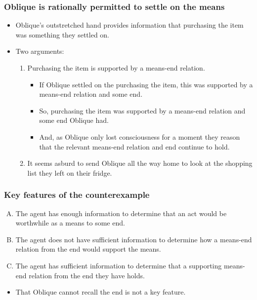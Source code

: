 \documentclass[noamssymb, compress, handout]{beamer} %
\newcommand{\hozlinedash}[0]{%
  \noindent\hdashrule[0.5ex][c]{\textwidth}{.1pt}{2.5pt}
}
\begin{document}
\begin{frame}
  \frametitle{Oblique is rationally permitted to settle on the means}

  \begin{itemize}
  \item Oblique's outstretched hand provides information that purchasing the item was something they settled on.
  \item Two arguments:
    \begin{enumerate}
    \item Purchasing the item is supported by a means-end relation.
      \begin{itemize}
      \item If Oblique settled on the purchasing the item, this was supported by a means-end relation and some end.
      \item So, purchasing the item was supported by a means-end relation and some end Oblique had.
      \item And, as Oblique only lost consciousness for a moment they reason that the relevant means-end relation and end continue to hold.
      \end{itemize}
    \item It seems asburd to send Oblique all the way home to look at the shopping list they left on their fridge.
    \end{enumerate}
  \end{itemize}

\end{frame}

\begin{frame}
  \frametitle{Key features of the counterexample}

  \begin{enumerate}[A)]
  \item The agent has enough information to determine that an act would be worthwhile as a means to some end.
  \item The agent does not have sufficient information to determine how a means-end relation from the end would support the means.
  \item The agent has sufficient information to determine that a supporting means-end relation from the end they have holds.
  \end{enumerate}

  \hozlinedash

  \begin{itemize}
  \item That Oblique cannot recall the end is not a key feature.
  \end{itemize}
\end{frame}
\end{document}
